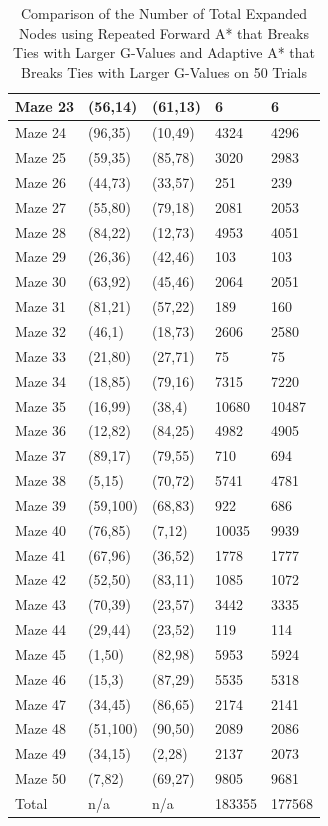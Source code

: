 \documentclass{article}
\begin{document}
\begin{table}
{\begin{tabular}{||p{1.5cm}|p{1.5cm}|p{1.5cm}|p{3.5cm}|p{3.5cm}||}
 \hline
 Maze 23 & (56,14) & (61,13) & 6 & 6\\
 \hline
 Maze 24 & (96,35) & (10,49) & 4324 & 4296\\ 
 \hline
 Maze 25 & (59,35) & (85,78) & 3020 & 2983\\
 \hline
  Maze 26 & (44,73) & (33,57) & 251 & 239\\
 \hline
 Maze 27 & (55,80) & (79,18) & 2081& 2053 \\
 \hline
 Maze 28 & (84,22) & (12,73) & 4953 & 4051 \\
 \hline
 Maze 29 & (26,36) & (42,46) & 103 & 103 \\
 \hline
 Maze 30 & (63,92) & (45,46) & 2064 & 2051 \\
 \hline
 Maze 31 & (81,21) & (57,22) & 189 & 160\\ 
 \hline
 Maze 32 & (46,1) & (18,73) & 2606 & 2580\\
 \hline
 Maze 33 & (21,80) & (27,71) & 75 & 75 \\
 \hline
 Maze 34 & (18,85) & (79,16) & 7315 & 7220\\
 \hline
 Maze 35 & (16,99) & (38,4) & 10680 & 10487 \\
 \hline
 Maze 36 & (12,82) & (84,25) & 4982 & 4905\\ 
 \hline
 Maze 37 & (89,17) & (79,55) & 710 & 694\\
 \hline
  Maze 38 & (5,15) & (70,72) & 5741 & 4781 \\
 \hline
 Maze 39 & (59,100) & (68,83) & 922 & 686\\
 \hline
 Maze 40 & (76,85) & (7,12) & 10035 & 9939\\
 \hline
 Maze 41 & (67,96) & (36,52) & 1778 & 1777 \\
 \hline
 Maze 42 & (52,50) & (83,11) & 1085 & 1072 \\
 \hline
 Maze 43 & (70,39) & (23,57) & 3442 & 3335\\ 
 \hline
 Maze 44 & (29,44) & (23,52) & 119 & 114 \\
 \hline
 Maze 45 & (1,50) & (82,98) & 5953 & 5924 \\
 \hline
 Maze 46 & (15,3) & (87,29) & 5535 & 5318 \\
 \hline
 Maze 47 &  (34,45) & (86,65)& 2174 & 2141\\ 
 \hline
 Maze 48 & (51,100) & (90,50)  & 2089 & 2086\\
 \hline
 Maze 49 & (34,15) & (2,28) & 2137 & 2073\\
 \hline
 Maze 50 & (7,82) & (69,27) & 9805 & 9681\\
\hline
Total & n/a & n/a & 183355 & 177568
\\[.3ex]
 \hline
\end{tabular}}
\caption{Comparison of the Number of Total Expanded Nodes using Repeated Forward A* that Breaks Ties with Larger G-Values and Adaptive A* that Breaks Ties with Larger G-Values on 50 Trials} 
\end{table} 
\end{document}
